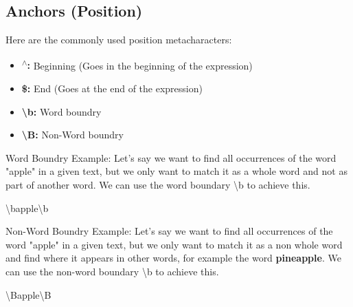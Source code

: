 \documentclass{report}
\begin{document}
    \subsection{Anchors (Position)}
    \bigbreak \noindent 
    Here are the commonly used position metacharacters:
    \begin{itemize}
        \item \textbf{\textsuperscript{$\wedge$}:} Beginning (Goes in the beginning of the expression)
        \item \textbf{\$:} End (Goes at the end of the expression)
        \item \textbf{\textbackslash b:} Word boundry
        \item \textbf{\textbackslash B:} Non-Word boundry
    \end{itemize}
    \bigbreak \noindent 
    Word Boundry Example:
    \bigbreak \noindent 
    Let's say we want to find all occurrences of the word "apple" in a given text, but we only want to match it as a whole word and not as part of another word. We can use the word boundary \textbackslash b to achieve this.
    \begin{center}
        \textbackslash bapple\textbackslash b
    \end{center}

    \bigbreak \noindent 
    Non-Word Boundry Example:
    \bigbreak \noindent 
    Let's say we want to find all occurrences of the word "apple" in a given text, but we only want to match it as a non whole word and find where it appears in other words, for example the word \textbf{pineapple}. We can use the non-word boundary \textbackslash b to achieve this.
    \begin{center}
        \textbackslash Bapple\textbackslash B
    \end{center}

    

    \pagebreak
    \bigbreak
    \noindent
\end{document}
